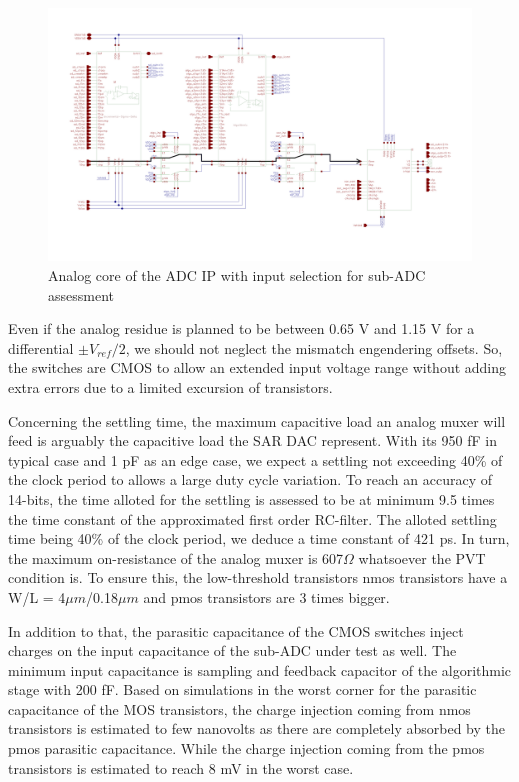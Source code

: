 \begin{figure}[htp]
    \centering
    \includegraphics[width=\textwidth]{Chapter5/Figs/adc_chip/adc-with-test-signal-path.png}
    \caption{Analog core of the ADC IP with input selection for sub-ADC assessment}
    \label{fig:adc-with-test}
\end{figure}

Even if the analog residue is planned to be between 0.65 V and 1.15 V for a differential $\pm V_{ref}/2$, we should not neglect the mismatch engendering offsets. So, the switches are CMOS to allow an extended input voltage range without adding extra errors due to a limited excursion of transistors.

Concerning the settling time, the maximum capacitive load an analog muxer will feed is arguably the capacitive load the SAR DAC represent. With its 950 fF in typical case and 1 pF as an edge case, we expect a settling not exceeding 40\% of the clock period to allows a large duty cycle variation. To reach an accuracy of 14-bits, the time alloted for the settling is assessed to be at minimum 9.5 times the time constant of the approximated first order RC-filter. The alloted settling time being 40\% of the clock period, we deduce a time constant of 421 ps. In turn, the maximum on-resistance of the analog muxer is 607$\Omega$ whatsoever the PVT condition is. To ensure this, the low-threshold transistors nmos transistors have a W/L = 4$\mu m$/0.18$\mu m$ and pmos transistors are 3 times bigger.
    
In addition to that, the parasitic capacitance of the CMOS switches inject charges on the input capacitance of the sub-ADC under test as well. The minimum input capacitance is sampling and feedback capacitor of the algorithmic stage with 200 fF. Based on simulations in the worst corner for the parasitic capacitance of the MOS transistors, the charge injection coming from nmos transistors is estimated to few nanovolts as there are completely absorbed by the pmos parasitic capacitance. While the charge injection coming from the pmos transistors is estimated to reach 8 mV in the worst case. 

